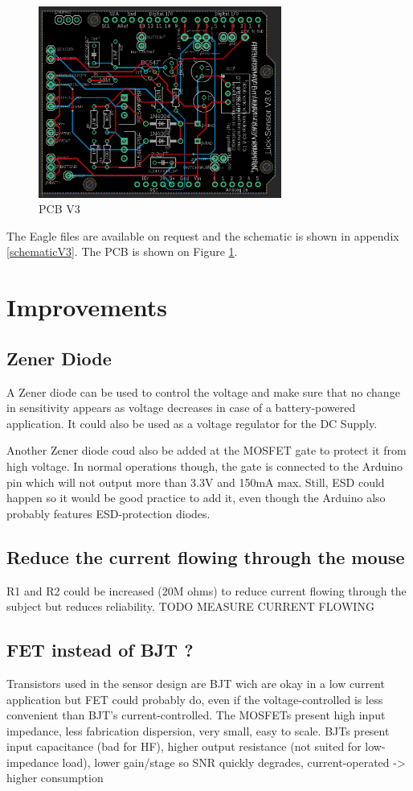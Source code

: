 \documentclass[a4paper]{article}
\begin{document}
\begin{figure}[h!t!b!]
    \centering
    \includegraphics[width = 8cm]{images/BoardViewV3.PNG}
    \caption{PCB V3}
    \label{fig:PCBV3}
\end{figure}

The Eagle files are available on request and the schematic is shown in appendix \ref{schematicV3}.
The PCB is shown on Figure \ref{fig:PCBV3}.

\newpage
\section{Improvements}
\subsection{Zener Diode}
A Zener diode can be used to control the voltage and make sure that no change in sensitivity appears as voltage decreases in case of a battery-powered application. It could also be used as a voltage regulator for the DC Supply.

Another Zener diode coud also be added at the MOSFET gate to protect it from high voltage. In normal operations though, the gate is connected to the Arduino pin which will not output more than 3.3V and 150mA max. Still, ESD could happen so it would be good practice to add it, even though the Arduino also probably features ESD-protection diodes.

\subsection{Reduce the current flowing through the mouse}
R1 and R2 could be increased (20M ohms) to reduce current flowing through the subject but reduces reliability.
TODO MEASURE CURRENT FLOWING

\subsection{FET instead of BJT ?}
Transistors used in the sensor design are BJT wich are okay in a low current application but FET could probably do, even if the voltage-controlled is less convenient than BJT's current-controlled.
The MOSFETs present high input impedance, less fabrication dispersion, very small, easy to scale.
BJTs present input capacitance (bad for HF), higher output resistance (not suited for low-impedance load), lower gain/stage so SNR quickly degrades, current-operated -> higher consumption
\end{document}
